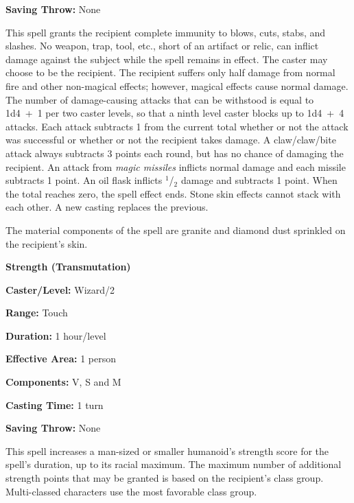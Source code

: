\begin{multicols}{2}
\begin{minipage}{\columnwidth}
\noindent \textbf{Saving Throw:} None

\end{minipage}

This spell grants the recipient complete immunity to blows, cuts, stabs, and slashes.  No weapon, trap, tool, etc., short of an artifact or relic, can inflict damage against the subject while the spell remains in effect.  The caster may choose to be the recipient.  The recipient suffers only half damage from normal fire and other non-magical effects; however, magical effects cause normal damage.  The number of damage-causing attacks that can be withstood is equal to 1d4~+~1 per two caster levels, so that a ninth level caster blocks up to 1d4~+~4 attacks.  Each attack subtracts 1 from the current total whether or not the attack was successful or whether or not the recipient takes damage.  A claw/claw/bite attack always subtracts 3 points each round, but has no chance of damaging the recipient.  An attack from \textit{magic missiles} inflicts normal damage and each missile subtracts 1 point.  An oil flask inflicts $^1$/$_2$ damage and subtracts 1 point.  When the total reaches zero, the spell effect ends.  Stone skin effects cannot stack with each other.  A new casting replaces the previous.

The material components of the spell are granite and diamond dust sprinkled on the recipient's skin.

\vspace{1em}

\noindent
\begin{minipage}{\columnwidth}

\noindent \textbf{Strength (Transmutation)}

\noindent \textbf{Caster/Level:} Wizard/2

\noindent \textbf{Range:} Touch

\noindent \textbf{Duration:} 1 hour/level

\noindent \textbf{Effective Area:} 1 person

\noindent \textbf{Components:} V, S and M

\noindent \textbf{Casting Time:} 1 turn

\noindent \textbf{Saving Throw:} None

\end{minipage}

This spell increases a man-sized or smaller humanoid's strength score for the spell's duration, up to its racial maximum.  The maximum number of additional strength points that may be granted is based on the recipient's class group.  Multi-classed characters use the most favorable class group.


\end{multicols}
